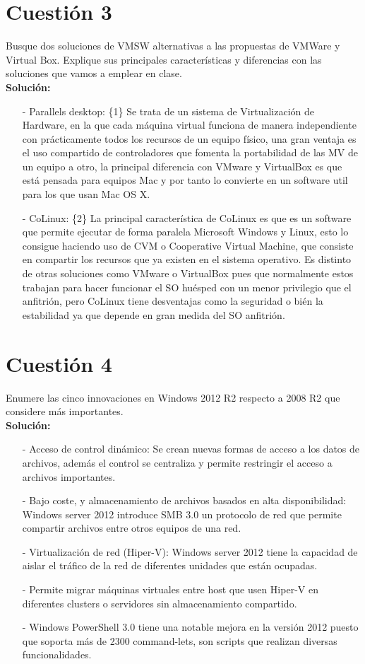 \documentclass[a4paper, 11pt]{article} %
\begin{document}
\section{Cuestión 3}
Busque dos soluciones de VMSW alternativas a las propuestas de VMWare y Virtual Box. Explique sus principales características y diferencias con las soluciones que vamos a emplear en clase.\\
\textbf{Solución:}
\begin{itemize}
\item[-] Parallels desktop:
	\{1\} Se trata de un sistema de Virtualización de Hardware, en la que cada máquina virtual funciona de manera independiente con prácticamente todos los recursos de un equipo físico, una gran ventaja es el uso compartido de controladores que fomenta la portabilidad de las MV de un equipo a otro, la principal diferencia con VMware y VirtualBox es que está pensada para equipos Mac y por tanto lo convierte en un software util para los que usan Mac OS X.
\item[-] CoLinux:
	\{2\} La principal característica de CoLinux es que es un software que permite ejecutar de forma paralela Microsoft Windows y Linux, esto lo consigue haciendo uso de CVM o Cooperative Virtual Machine, que consiste en compartir los recursos que ya existen en el sistema operativo. Es distinto de otras soluciones como VMware o VirtualBox pues que normalmente estos trabajan para hacer funcionar el SO huésped con un menor privilegio que el anfitrión, pero CoLinux tiene desventajas como la seguridad o bién la estabilidad ya que depende en gran medida del SO anfitrión.
\end{itemize}
\section{Cuestión 4}
Enumere las cinco innovaciones en Windows 2012 R2 respecto a 2008 R2 que considere más importantes.\\
\textbf{Solución:}\\
\begin{itemize}
\item[-]Acceso de control dinámico: Se crean nuevas formas de acceso a los datos de archivos, además el control se centraliza y permite restringir el acceso a archivos importantes.
\item[-]Bajo coste, y almacenamiento de archivos basados en alta disponibilidad: Windows server 2012 introduce SMB 3.0 un protocolo de red que permite compartir archivos entre otros equipos de una red.
\item[-]Virtualización de red (Hiper-V): Windows server 2012 tiene la capacidad de aislar el tráfico de la red  de diferentes unidades que están ocupadas.
\item[-]Permite migrar máquinas virtuales entre host que usen Hiper-V en diferentes clusters o servidores sin almacenamiento compartido.
\item[-]Windows PowerShell 3.0 tiene una notable mejora en la versión 2012 puesto que soporta más de 2300 command-lets, son scripts que realizan diversas funcionalidades.
\end{itemize}
\end{document}
